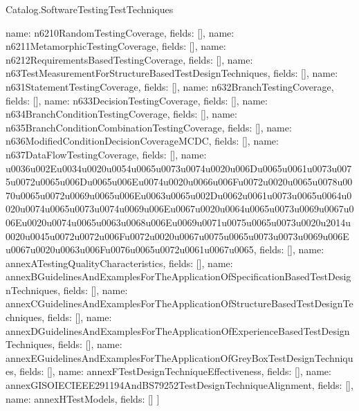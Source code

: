 \begin{lexlean}{Catalog.SoftwareTestingTestTechniques}
\begin{semanticmodule}
{    {name: n6210RandomTestingCoverage, fields: []},
    {name: n6211MetamorphicTestingCoverage, fields: []},
    {name: n6212RequirementsBasedTestingCoverage, fields: []},
    {name: n63TestMeasurementForStructureBasedTestDesignTechniques, fields: []},
    {name: n631StatementTestingCoverage, fields: []},
    {name: n632BranchTestingCoverage, fields: []},
    {name: n633DecisionTestingCoverage, fields: []},
    {name: n634BranchConditionTestingCoverage, fields: []},
    {name: n635BranchConditionCombinationTestingCoverage, fields: []},
    {name: n636ModifiedConditionDecisionCoverageMCDC, fields: []},
    {name: n637DataFlowTestingCoverage, fields: []},
    {name: u0036u002Eu0034u0020u0054u0065u0073u0074u0020u006Du0065u0061u0073u0075u0072u0065u006Du0065u006Eu0074u0020u0066u006Fu0072u0020u0065u0078u0070u0065u0072u0069u0065u006Eu0063u0065u002Du0062u0061u0073u0065u0064u0020u0074u0065u0073u0074u0069u006Eu0067u0020u0064u0065u0073u0069u0067u006Eu0020u0074u0065u0063u0068u006Eu0069u0071u0075u0065u0073u0020u2014u0020u0045u0072u0072u006Fu0072u0020u0067u0075u0065u0073u0073u0069u006Eu0067u0020u0063u006Fu0076u0065u0072u0061u0067u0065, fields: []},
    {name: annexATestingQualityCharacteristics, fields: []},
    {name: annexBGuidelinesAndExamplesForTheApplicationOfSpecificationBasedTestDesignTechniques, fields: []},
    {name: annexCGuidelinesAndExamplesForTheApplicationOfStructureBasedTestDesignTechniques, fields: []},
    {name: annexDGuidelinesAndExamplesForTheApplicationOfExperienceBasedTestDesignTechniques, fields: []},
    {name: annexEGuidelinesAndExamplesForTheApplicationOfGreyBoxTestDesignTechniques, fields: []},
    {name: annexFTestDesignTechniqueEffectiveness, fields: []},
    {name: annexGISOIECIEEE291194AndBS79252TestDesignTechniqueAlignment, fields: []},
    {name: annexHTestModels, fields: []}
  ]
}


\end{semanticmodule}
\end{lexlean}
